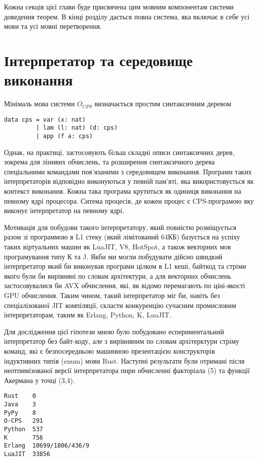 \begin{definition}
\begin{definition}
\begin{definition}
\begin{definition}
Кожна секція цієї глави буде присвячена цим мовним компонентам
системи доведення теорем. В кінці розділу дається повна система, яка включає в себе усі
мови та усі мовні перетворення.

\newpage
\section{Інтерпретатор та середовище виконання}

Мінімаль мова системи $O_{CPS}$ визначається простим
синтаксичним деревом

\begin{lstlisting}
data cps = var (x: nat)
         | lam (l: nat) (d: cps)
         | app (f a: cps)
\end{lstlisting}

Однак, на практиці, застосовують більш складні описи синтаксичних дерев,
зокрема для лінивих обчислень, та розширення синтаксичного дерева спеціальними
командами пов'язаними з середовищем виконання. Програми таких
інтерпретаторів відповідно виконуються у певній пам'яті, яка
використовується як контекст виконання. Кожна така програма крутиться
як одиниця виконання на певному ядрі процесора. Ситема процесів, де
кожен процес є CPS-програмою яку виконує інтерпретатор на певному ядрі.

Мотивація для побудови такого інтерпретатору, який повністю розміщується
разом зі программою в L1 стеку (який лімітований 64КБ) базується на успіху
таких віртуальних машин як LuaJIT, V8, HotSpot, а також векторних мов
програмування типу К та J. Якби ми могли побудувати дійсно швидкий інтерпретатор
який би виконував програми цілком в L1 кеші, байткод та стріми якого були би
вирівняні по словам архітектури, а для векторних обчислень застосовувалися би AVX обчислення,
які, як відомо перемагають по ціні-якості GPU обчислення. Таким чином, такий
інтерпретатор міг би, навіть без спеціалізованої JIT компіляції, скласти
конкуренцію сучасним промисловим інтерпретаторам, таким як Erlang, Python, K, LuaJIT.

Для дослідження цієї гіпотези мною було побудовано еспериментальний інтерпретатор
без байт-коду, але з вирівняним по словам архітерктури стріму команд, які є
безпосередньою машинною презентацією конструкторів індуктивних типів (enum) мови Rust.
Наступні результати були отримані після неотпимізованої версії інтерпретатора
пнри обчисленні факторіала (5) та функції Акермана у точці (3,4).

\begin{lstlisting}
Rust    0
Java    3
PyPy    8
O-CPS   291
Python  537
K       756
Erlang  10699/1806/436/9
LuaJIT  33856
\end{lstlisting}


\end{definition}
\end{definition}
\end{definition}
\end{definition}
